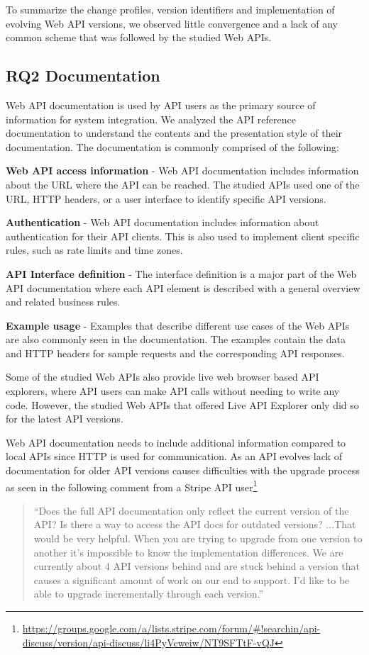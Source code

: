 \documentclass[conference]{IEEEtran}
\begin{document}
To summarize the change profiles, version identifiers and implementation of evolving Web API versions, we observed little convergence and a lack of any common scheme that was followed by the studied Web APIs.

\subsection{RQ2 Documentation} %
\label{sub:documentation}
Web API documentation is used by API users as the primary source of information for system integration. We analyzed the API reference documentation to understand the contents and the presentation style of their documentation. The documentation is commonly comprised of the following:

\textbf{Web API access information} - Web API documentation includes information about the URL where the API can be reached. The studied APIs used one of the URL, HTTP headers, or a user interface to identify specific API versions.

\textbf{Authentication} - Web API documentation includes information about authentication for their API clients. This is also used to implement client specific rules, such as rate limits and time zones.

\textbf{API Interface definition} - The interface definition is a major part of the Web API documentation where each API element is described with a general overview  and related business rules.

\textbf{Example usage} - Examples that describe different use cases of the Web APIs are also commonly seen in the documentation. The examples contain the data and HTTP headers for sample requests and the corresponding API responses.

Some of the studied Web APIs also provide live web browser based API explorers, where API users can make API calls without needing to write any code. However, the studied Web APIs that offered Live API Explorer only did so for the latest API versions.

Web API documentation needs to include additional information compared to local APIs since HTTP is used for communication. As an API evolves lack of documentation for older API versions causes difficulties with the upgrade process as seen in the following comment from a Stripe API user\footnote{\url{https://groups.google.com/a/lists.stripe.com/forum/#!searchin/api-discuss/version/api-discuss/li4PyVcweiw/NT9SFTtF-vQJ}}

\small
\begin{quotation}
 ``Does the full API documentation only reflect the current version of the
  API?  Is there a way to access the API docs for outdated versions? ...That would be very helpful. When you are trying to upgrade from one version to another it's impossible to know the implementation differences. We are currently about 4 API versions behind and are stuck behind a version that causes a significant amount of work on our end to support. I'd like to be able to upgrade incrementally through each version.''
\end{quotation}
\normalsize
\end{document}
